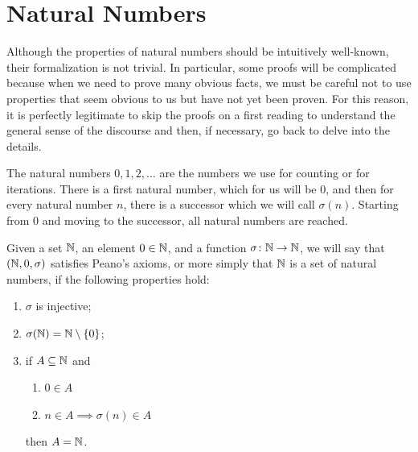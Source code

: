 \section{Natural Numbers}
\label{sec:naturali}

Although the properties of natural numbers should be intuitively well-known,
their formalization is not trivial. In particular, some proofs will be
complicated because when we need to prove many obvious facts, we must be careful
not to use properties that seem obvious to us but have not yet been proven. For
this reason, it is perfectly legitimate to skip the proofs on a first reading to
understand the general sense of the discourse and then, if necessary, go back to
delve into the details.

The natural numbers $0,1,2,\dots$ are the numbers we use for counting or for
iterations. There is a first natural number, which for us will be $0$, and then
for every natural number $n$, there is a successor which we will call
$\sigma(n)$. Starting from $0$ and moving to the successor, all natural numbers
are reached.

\begin{definition}
  \label{def:assiomi_peano}%
  \label{def:naturali}%
  \index{$\NN$}%
Given a set $\NN$, 
an element $0\in {\mathbb N}$, 
and a function $\sigma\colon {\mathbb N}\to{\mathbb N}$, 
we will say that $({\mathbb N},0,\sigma)$
satisfies Peano's axioms,
or more simply that $\NN$ is a set of natural numbers,
if the following properties hold: 
\begin{enumerate}
  \item $\sigma$ is injective;
  \item $\sigma({\mathbb N}) = {\mathbb N} \setminus{\left\{ 0 \right\}}$;
  \item if $A\subseteq {\mathbb N}$ and 
  \begin{enumerate} 
    \item[(i)] $0\in A$ 
    \item[(ii)] $n\in A \implies \sigma(n)\in A$
  \end{enumerate}
  then $A={\mathbb N}$.
\end{enumerate}
\end{definition}


